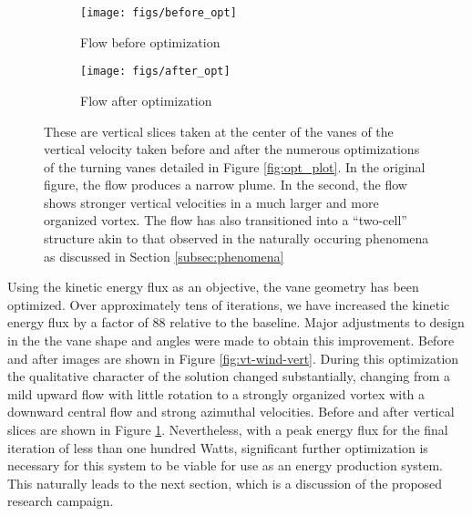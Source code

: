 

%
%
\begin{figure}[htb!]
 \begin{subfigure}{.5\textwidth}
  \centering
  \texttt{[image: figs/before\_opt]}
  \caption{Flow before optimization}
 \end{subfigure}%
 \begin{subfigure}{.5\textwidth}
  \centering
  \texttt{[image: figs/after\_opt]}
  \caption{Flow after optimization}
 \end{subfigure}%
  \caption{These are vertical slices taken at the center of the vanes of
 the vertical velocity taken before and after the numerous optimizations
 of the turning vanes detailed in Figure \ref{fig:opt_plot}. In the
 original figure, the flow produces a narrow plume. In the second, the
 flow shows stronger vertical velocities in a much larger and more
 organized vortex. The flow has also transitioned into a ``two-cell''
 structure akin to that observed in the naturally occuring phenomena as
 discussed in Section \ref{subsec:phenomena}}
  \label{fig:opt_flow}
\end{figure}
%

Using the kinetic energy flux as an objective, the vane geometry has
been optimized. Over approximately tens of iterations, we have
increased the kinetic energy flux by a factor of 88 relative to the
baseline. 
Major adjustments to design in the the vane
shape and angles were made to obtain this improvement. Before and after
images are shown in Figure \ref{fig:vt-wind-vert}. During this
optimization the 
qualitative character of the solution changed substantially, changing
from a mild upward flow with little rotation to a strongly organized
vortex with a downward central flow and strong azimuthal
velocities. Before and after vertical slices are shown in Figure
\ref{fig:opt_flow}. Nevertheless, with a peak energy flux for the final 
iteration of less than one hundred Watts, significant further
optimization is necessary for this system to be viable for use as an 
energy production system. This naturally leads to the next section,
which is a discussion of the proposed research campaign. 


